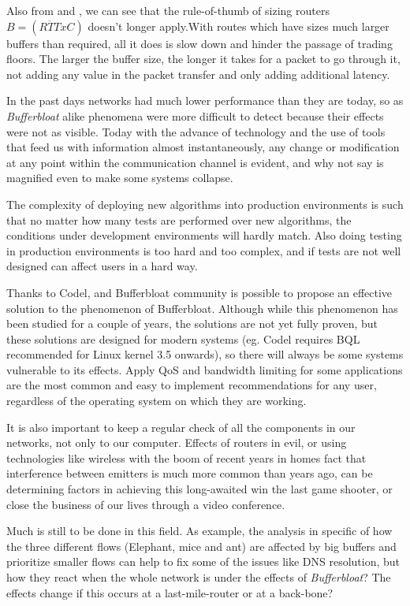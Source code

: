 Also from \cite{main:ref:1} and \cite{Vu-Brugier}, we can see that the rule-of-thumb of sizing routers $B = (\overline{RTT}xC)$ doesn't longer apply.With
routes which have sizes much larger buffers than required, all it does is slow
down and hinder the passage of trading floors. The larger the buffer size, the
longer it takes for a packet to go through it, not adding any value in the
packet transfer and only adding additional latency.

In the past days networks had much lower performance than they are today,
so as \emph{Bufferbloat} alike phenomena were more difficult to detect
because their effects were not as visible. Today with the advance of
technology and the use of tools that feed us with information almost
instantaneously, any change or modification at any point within the
communication channel is evident, and why not say is magnified even to make
some systems collapse.

The complexity of deploying new algorithms into production environments is
such that no matter how many tests are performed over new algorithms, the
conditions under development environments will hardly match. Also doing testing
in production environments is too hard and too complex\cite{Vu-Brugier},
and if tests are not well designed can affect users in a hard way.

Thanks to Codel, and Bufferbloat community is possible to propose an effective
solution to the phenomenon of Bufferbloat. Although while this phenomenon has been studied for a couple of years, the solutions are not yet fully proven,
but these solutions are designed
for modern systems (eg. Codel requires BQL recommended for Linux kernel 3.5
onwards), so there will always be some systems vulnerable to its effects. Apply
QoS and bandwidth limiting for some applications are the
most common and easy to implement recommendations for any user, regardless of
the operating system on which they are working.

It is also important to keep a regular check of all the components in our
networks, not only to our computer. Effects of routers in evil, or using
technologies like wireless with the boom of recent years in homes fact that
interference between emitters is much more common than years ago, can be
determining factors in achieving this long-awaited win the last game shooter,
or close the business of our lives through a video conference.

Much is still to be done in this field. As example, the analysis in specific of
how the three different flows (Elephant, mice and
ant)\cite{HaElephants, evolvshortlongflows} are affected by big buffers
and prioritize smaller flows can help to fix some of the issues like DNS
resolution, but how they react when the whole network is under the effects of
\emph{Bufferbloat}? The effects change if this occurs at a last-mile-router
or at a back-bone?

